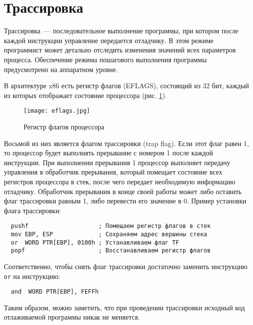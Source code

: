 
\section{Трассировка}
Трассировка~--- последовательное выполнение программы, при котором после каждой
инструкции управление передается отладчику. В этом режиме программист может
детально отследить изменения значений всех параметров процесса. Обеспечение
режима пошагового выполнения программы предусмотрено на аппаратном уровне.

В архитектуре x86 есть регистр флагов (EFLAGS), состоящий из 32 бит, каждый из
которых отображает состояние процессора (рис.  \ref{fig:eflags}).
\begin{figure}[htpb]
  \centering
  \texttt{[image: eflags.jpg]}
  \caption{Регистр флагов процессора}
  \label{fig:eflags}
\end{figure}
Восьмой из них является флагом трассировки (trap flag). Если этот флаг равен 1,
то процессор будет выполнять прерывание с номером 1 после каждой инструкции. При
выполнении прерывания 1 процессор выполняет передачу управления в обработчик
прерывания, который помещает состояние всех регистров процессора в стек, после
чего передает необходимую информацию отладчику. Обработчик прерывания в конце
своей работы может либо оставить флаг трассировки равным 1, либо перевести его
значение в 0.
\newpage
Пример установки флага трассировки:
\begin{verbatim}
  pushf                    ; Помещаем регистр флагов в стек
  mov EBP, ESP             ; Сохраняем адрес вершины стека
  or  WORD PTR[EBP], 0100h ; Устанавливаем флаг TF
  popf                     ; Восстанавливаем регистр флагов
\end{verbatim}
Соответственно, чтобы снять флаг трассировки достаточно заменить инструкцию
\verb!or! на инструкцию:
\begin{verbatim}
  and  WORD PTR[EBP], FEFFh
\end{verbatim}

Таким образом, можно заметить, что при проведении трассировки исходный код
отлаживаемой программы никак не меняется.

